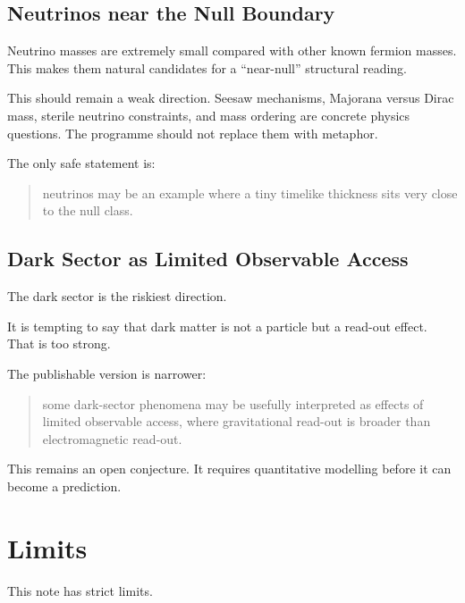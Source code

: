 \documentclass[12pt,a4paper]{article}
\theoremstyle{definition}
\theoremstyle{remark}
\begin{document}
\subsection{Neutrinos near the Null
Boundary}\label{neutrinos-near-the-null-boundary}

Neutrino masses are extremely small compared with other known fermion
masses. This makes them natural candidates for a ``near-null''
structural reading.

This should remain a weak direction. Seesaw mechanisms, Majorana versus
Dirac mass, sterile neutrino constraints, and mass ordering are concrete
physics questions. The programme should not replace them with metaphor.

The only safe statement is:

\begin{quote}
neutrinos may be an example where a tiny timelike thickness sits very
close to the null class.
\end{quote}

\subsection{Dark Sector as Limited Observable
Access}\label{dark-sector-as-limited-observable-access}

The dark sector is the riskiest direction.

It is tempting to say that dark matter is not a particle but a read-out
effect. That is too strong.

The publishable version is narrower:

\begin{quote}
some dark-sector phenomena may be usefully interpreted as effects of
limited observable access, where gravitational read-out is broader than
electromagnetic read-out.
\end{quote}

This remains an open conjecture. It requires quantitative modelling
before it can become a prediction.

\section{Limits}\label{limits}

This note has strict limits.
\end{document}
